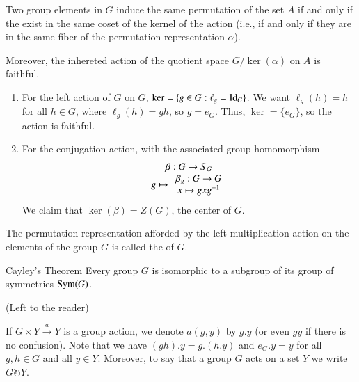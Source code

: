 \documentclass[12pt, a4paper, twoside, openright, titlepage]{book}
\begin{document}
\begin{rmk}{}{}
    Two group elements in $G$ induce the same permutation of the set $A$ if and only if the exist in the same coset of the kernel of the action (i.e., if and only if they are in the same fiber of the permutation representation $\alpha$).


    Moreover, the inhereted action of the quotient space $G/\ker(\alpha)$ on $A$ is faithful.
\end{rmk}


\begin{eg}{}{}
        \leavevmode
        \begin{enumerate}
                \item For the left action of $G$ on $G$, $\ker = \{g \in G: \ell_g = \operatorname{Id}_G\}$. We want $\ell_g(h) = h$ for all $h \in G$, where $\ell_g(h) = gh$, so $g = e_G$. Thus, $\ker = \{e_G\}$, so the action is faithful.
                \item For the conjugation action, with the associated group homomorphism \begin{equation}
                                \begin{array}{c} \beta:G\rightarrow S_G \\ g\mapsto\begin{array}{c} \beta_g:G\rightarrow G \\ x\mapsto gxg^{-1} \end{array} \end{array}
                        \end{equation}
                        We claim that $\ker(\beta) = Z(G)$, the center of $G$.
        \end{enumerate}
\end{eg}


\begin{defn}{}{}
    The permutation representation afforded by the left multiplication action on the elements of the group $G$ is called the  of $G$.
\end{defn}

\begin{namthm}{Cayley's Theorem}{}
        Every group $G$ is isomorphic to a subgroup of its group of symmetries $\operatorname{Sym}(G)$.
\end{namthm}
\begin{proof*}{}{}
        (Left to the reader)
\end{proof*}


\begin{nota*}{}{} 
        If $G\times Y\xrightarrow{a}Y$ is a group action, we denote $a(g,y)$ by $g.y$ (or even $gy$ if there is no confusion). Note that we have $(gh).y = g.(h.y)$ and $e_G.y = y$ for all $g,h \in G$ and all $y \in Y$. Moreover, to say that a group $G$ acts on a set $Y$ we write $G \circlearrowright Y$.
\end{nota*}
\end{document}
